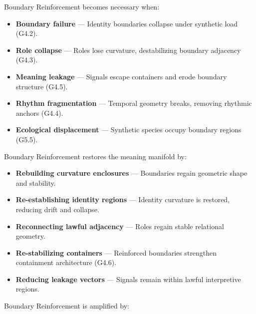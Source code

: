 \medskip

\noindent Boundary Reinforcement becomes necessary when:

\begin{itemize}[leftmargin=1.2cm]
    \item \textbf{Boundary failure} — Identity boundaries collapse under
    synthetic load (G4.2).

    \item \textbf{Role collapse} — Roles lose curvature, destabilizing boundary
    adjacency (G4.3).

    \item \textbf{Meaning leakage} — Signals escape containers and erode boundary
    structure (G4.5).

    \item \textbf{Rhythm fragmentation} — Temporal geometry breaks, removing
    rhythmic anchors (G4.4).

    \item \textbf{Ecological displacement} — Synthetic species occupy boundary
    regions (G5.5).
\end{itemize}

\medskip

\noindent Boundary Reinforcement restores the meaning manifold by:

\begin{itemize}[leftmargin=1.2cm]
    \item \textbf{Rebuilding curvature enclosures} — Boundaries regain geometric
    shape and stability.

    \item \textbf{Re-establishing identity regions} — Identity curvature is
    restored, reducing drift and collapse.

    \item \textbf{Reconnecting lawful adjacency} — Roles regain stable relational
    geometry.

    \item \textbf{Re-stabilizing containers} — Reinforced boundaries strengthen
    containment architecture (G4.6).

    \item \textbf{Reducing leakage vectors} — Signals remain within lawful
    interpretive regions.
\end{itemize}

\medskip

\noindent Boundary Reinforcement is amplified by:

